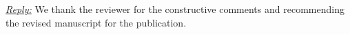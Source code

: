 
\vspace{1eM}
\underline{\textit{Reply:}} We thank the reviewer for the constructive comments and recommending the revised manuscript for the publication. 
